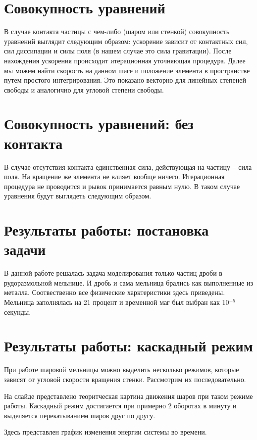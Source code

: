 \documentclass[a4paper]{article}
\begin{document}
\section{Совокупность уравнений}

В случае контакта частицы с чем-либо (шаром или стенкой) совокупность уравнений выглядит следующим образом: ускорение зависит от контактных сил, сил диссипации и силы поля (в нашем случае это сила гравитации).
После нахождения ускорения происходит итерационная уточняющая процедура.
Далее мы можем найти скорость на данном шаге и положение элемента в пространстве путем простого интегрирования.
Это показано векторно для линейных степеней свободы и аналогично для угловой степени свободы.

\section{Совокупность уравнений: без контакта}

В случае отсутствия контакта единственная сила, действующая на частицу -- сила поля.
На вращение же элемента не влияет вообще ничего.
Итерационная процедура не проводится и рывок принимается равным нулю.
В таком случае уравнения будут выглядеть следующим образом.

\section{Результаты работы: постановка задачи}

В данной работе решалась задача моделирования только частиц дроби в рудоразмольной мельнице.
И дробь и сама мельница брались как выполненные из металла.
Соотвественно все физические харктеристики здесь приведены.
Мельница заполнялась на 21 процент и временной маг был выбран как 10$^{-5}$ секунды.

\section{Результаты работы: каскадный режим}

При работе шаровой мельницы можно выделить несколько режимов, которые зависят от угловой скорости вращения стенки.
Рассмотрим их последовательно.

На слайде представлено теоритческая картина движения шаров при таком режиме работы.
Каскадный режим достигается при примерно 2 оборотах в минуту и выделяется перекатыванием шаров друг по другу.

Здесь представлен график изменения энергии системы во времени.
\end{document}
